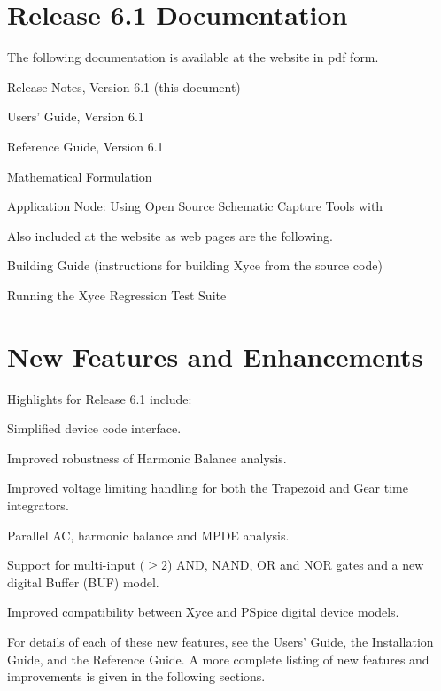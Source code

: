 \documentclass[11pt,report,strict]{SANDreport}
\begin{document}
\section{\Xyce{} Release 6.1 Documentation}
The following \Xyce{} documentation is available at the \Xyce{} website in pdf
form.
\begin{XyceItemize}
\item \Xyce{} Release Notes, Version 6.1 (this document)
\item \Xyce{} Users' Guide, Version 6.1
\item \Xyce{} Reference Guide, Version 6.1
\item \Xyce{} Mathematical Formulation
\item Application Node: Using Open Source Schematic Capture Tools with \Xyce{}
\end{XyceItemize}
Also included at the \Xyce{} website as web pages are the following.
\begin{XyceItemize}
\item Building Guide (instructions for building Xyce from the source code)
\item Running the Xyce Regression Test Suite
\end{XyceItemize}

\section{New Features and Enhancements}

Highlights for \Xyce{} Release 6.1 include:
\begin{XyceItemize}
\item Simplified device code interface.
\item Improved robustness of Harmonic Balance analysis.
\item Improved voltage limiting handling for both the Trapezoid and Gear time integrators.
\item Parallel AC, harmonic balance and MPDE analysis.
\item Support for multi-input ($\geq$2) AND, NAND, OR and NOR gates and a new digital Buffer (BUF) model.
\item Improved compatibility between Xyce and PSpice digital device models.
\end{XyceItemize}
For details of each of these new features, see the \Xyce{} Users' Guide, the
\Xyce{} Installation Guide, and the \Xyce{} Reference Guide.  A more complete
listing of new features and improvements is given in the following sections.
\end{document}

